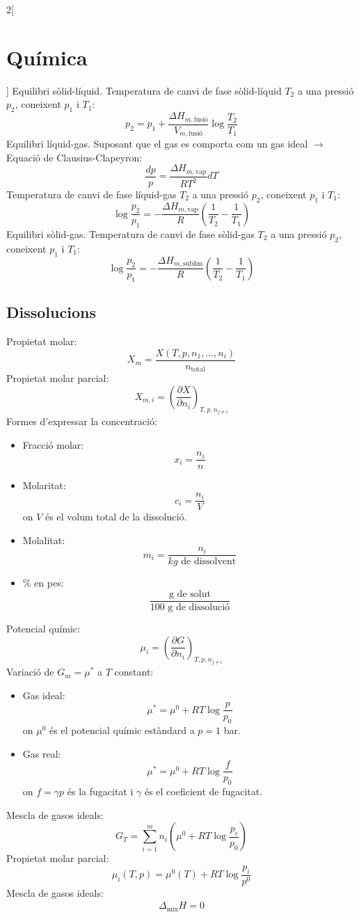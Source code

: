 \documentclass[class=article,10pt,crop=false]{standalone}
\begin{document}
\begin{multicols}{2}[\section{Química}]
Equilibri sòlid-líquid. Temperatura de canvi de fase sòlid-líquid $T_2$ a una pressió $p_2$, coneixent $p_1$ i $T_1$:
$$p_2=p_1+\frac{\Delta H_{m,\text{fusió}}}{V_{m,\text{fusió}}}\log\frac{T_2}{T_1}$$
Equilibri líquid-gas. Suposant que el gas es comporta com un gas ideal $\rightarrow$ Equació de Clausius-Clapeyron: $$\frac{dp}{p}=\frac{\Delta H_{m,\text{vap}}}{RT^2}dT$$
Temperatura de canvi de fase líquid-gas $T_2$ a una pressió $p_2$, coneixent $p_1$ i $T_1$: $$\log\frac{p_2}{p_1}=-\frac{\Delta H_{m,\text{vap}}}{R}\left(\frac{1}{T_2}-\frac{1}{T_1}\right)$$
Equilibri sòlid-gas. Temperatura de canvi de fase sòlid-gas $T_2$ a una pressió $p_2$, coneixent $p_1$ i $T_1$: $$\log\frac{p_2}{p_1}=-\frac{\Delta H_{m,\text{sublim}}}{R}\left(\frac{1}{T_2}-\frac{1}{T_1}\right)$$
\subsection{Dissolucions}
Propietat molar: $$X_m=\frac{X(T,p,n_1,\ldots,n_i)}{n_\text{total}}$$
Propietat molar parcial: $$X_{m,i}=\left(\frac{\partial X}{\partial n_i}\right)_{T,p,n_{j\ne i}}$$
Formes d'expressar la concentració:
\begin{itemize}
    \item Fracció molar: $$x_i=\frac{n_i}{n}$$
    \item Molaritat: $$c_i=\frac{n_i}{V}$$ {\footnotesize on $V$ és el volum total de la dissolució.}
    \item Molalitat: $$m_i=\frac{n_i}{kg\text{ de dissolvent}}$$ 
    \item \% en pes: $$\frac{\text{g de solut}}{\text{100 g de dissolució}}$$
\end{itemize}
Potencial químic: $$\mu_i=\left(\frac{\partial G}{\partial n_i}\right)_{T,p,n_{j\ne i}}$$
Variació de $G_m=\mu^*$ a $T$ constant:
\begin{itemize}
    \item Gas ideal: $$\mu^*=\mu^0+RT\log\frac{p}{p_0}$$ {\footnotesize on $\mu^0$ és el potencial químic estàndard a $p=1$ bar.}
    \item Gas real: $$\mu^*=\mu^0+RT\log\frac{f}{p_0}$$ {\footnotesize on $f=\gamma p$ és la fugacitat i $\gamma$ és el coeficient de fugacitat.}
\end{itemize}
Mescla de gasos ideals: $$G_T=\sum_{i=1}^mn_i\left(\mu^0+RT\log\frac{p_i}{p_0}\right)$$
Propietat molar parcial: $$\mu_i(T,p)=\mu^0(T)+RT\log\frac{p_i}{p^0}$$
Mescla de gasos ideals: 
\begin{gather*}
    \Delta_\text{mix}H=0\\

\end{gather*}
\end{multicols}
\end{document}
